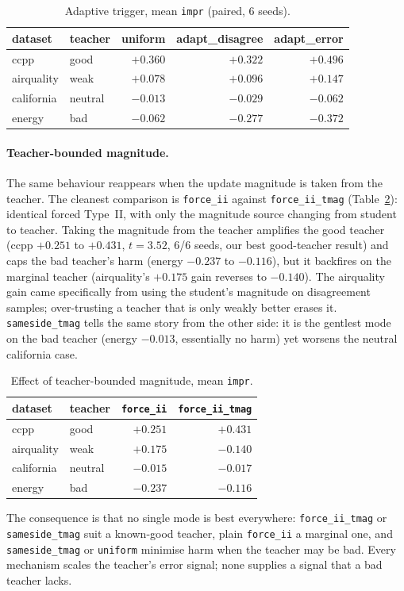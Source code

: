 \begin{table}[t]
\centering
\footnotesize
\caption{Adaptive trigger, mean \texttt{impr} (paired, 6 seeds).}
\label{tab:adaptive}
\begin{tabular}{llrrr}
\toprule
dataset & teacher & uniform & adapt\_disagree & adapt\_error \\
\midrule
ccpp       & good    & $+0.360$ & $+0.322$ & $\mathbf{+0.496}$ \\
airquality & weak    & $+0.078$ & $+0.096$ & $+0.147$ \\
california & neutral & $-0.013$ & $-0.029$ & $-0.062$ \\
energy     & bad     & $-0.062$ & $-0.277$ & $\mathbf{-0.372}$ \\
\bottomrule
\end{tabular}
\end{table}

\paragraph{Teacher-bounded magnitude.}
The same behaviour reappears when the update magnitude is taken from the teacher. The
cleanest comparison is \texttt{force\_ii} against \texttt{force\_ii\_tmag}
(Table~\ref{tab:tmag}): identical forced Type~II, with only the magnitude source changing
from student to teacher. Taking the magnitude from the teacher amplifies the good teacher
(ccpp $+0.251$ to $+0.431$, $t=3.52$, 6/6 seeds, our best good-teacher result) and caps the
bad teacher's harm (energy $-0.237$ to $-0.116$), but it backfires on the marginal teacher
(airquality's $+0.175$ gain reverses to $-0.140$). The airquality gain came specifically
from using the student's magnitude on disagreement samples; over-trusting a teacher that is
only weakly better erases it. \texttt{sameside\_tmag} tells the same story from the other
side: it is the gentlest mode on the bad teacher (energy $-0.013$, essentially no harm) yet
worsens the neutral california case.

\begin{table}[t]
\centering
\footnotesize
\caption{Effect of teacher-bounded magnitude, mean \texttt{impr}.}
\label{tab:tmag}
\begin{tabular}{llrr}
\toprule
dataset & teacher & \texttt{force\_ii} & \texttt{force\_ii\_tmag} \\
\midrule
ccpp       & good    & $+0.251$ & $\mathbf{+0.431}$ \\
airquality & weak    & $\mathbf{+0.175}$ & $-0.140$ \\
california & neutral & $-0.015$ & $-0.017$ \\
energy     & bad     & $-0.237$ & $-0.116$ \\
\bottomrule
\end{tabular}
\end{table}

The consequence is that no single mode is best everywhere:
\texttt{force\_ii\_tmag} or \texttt{sameside\_tmag} suit a known-good teacher, plain
\texttt{force\_ii} a marginal one, and \texttt{sameside\_tmag} or \texttt{uniform} minimise
harm when the teacher may be bad. Every mechanism scales the teacher's error signal; none
supplies a signal that a bad teacher lacks.
